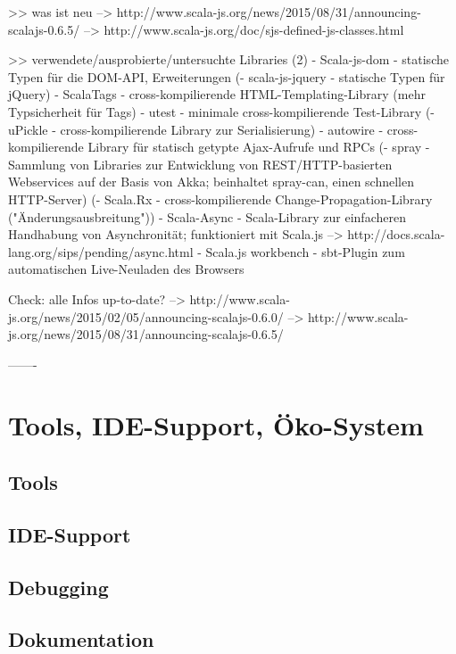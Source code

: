 \documentclass[a4paper, 12pt, listof=totoc, bibliography=totoc]{scrreprt}
\begin{document}
>> was ist neu
  -->  http://www.scala-js.org/news/2015/08/31/announcing-scalajs-0.6.5/
  -->  http://www.scala-js.org/doc/sjs-defined-js-classes.html





>> verwendete/ausprobierte/untersuchte Libraries (2)
  - Scala-js-dom - statische Typen für die DOM-API, Erweiterungen
  (- scala-js-jquery - statische Typen für jQuery)
  - ScalaTags - cross-kompilierende HTML-Templating-Library (mehr Typsicherheit für Tags)
  - utest - minimale cross-kompilierende Test-Library
  (- uPickle - cross-kompilierende Library zur Serialisierung)
  - autowire - cross-kompilierende Library für statisch getypte Ajax-Aufrufe und RPCs
  (- spray - Sammlung von Libraries zur Entwicklung von REST/HTTP-basierten Webservices auf der Basis von Akka; beinhaltet spray-can, einen schnellen HTTP-Server)
  (- Scala.Rx - cross-kompilierende Change-Propagation-Library ("Änderungsausbreitung"))
  - Scala-Async - Scala-Library zur einfacheren Handhabung von Asynchronität; funktioniert mit Scala.js -->  http://docs.scala-lang.org/sips/pending/async.html
  - Scala.js workbench - sbt-Plugin zum automatischen Live-Neuladen des Browsers


Check: alle Infos up-to-date?
-->  http://www.scala-js.org/news/2015/02/05/announcing-scalajs-0.6.0/
-->  http://www.scala-js.org/news/2015/08/31/announcing-scalajs-0.6.5/




-------

\section{Tools, IDE-Support, Öko-System}

\subsection{Tools}

\subsection{IDE-Support}

\subsection{Debugging}

\subsection{Dokumentation}
\end{document}
